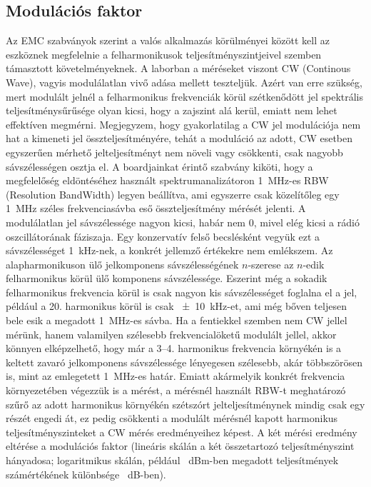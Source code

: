         \subsection{Modulációs faktor}
            Az EMC szabványok szerint a valós alkalmazás körülményei között kell az eszköznek megfelelnie a felharmonikusok teljesítményszintjeivel szemben támasztott követelményeknek. A laborban a méréseket viszont CW (Continous Wave), vagyis modulálatlan vivő adása mellett teszteljük. Azért van erre szükség, mert modulált jelnél a felharmonikus frekvenciák körül szétkenődött jel spektrális teljesítménysűrűsége olyan kicsi, hogy a zajszint alá kerül, emiatt nem lehet effektíven megmérni. Megjegyzem, hogy gyakorlatilag a CW jel modulációja nem hat a kimeneti jel összteljesítményére, tehát a moduláció az adott, CW esetben egyszerűen mérhető jelteljesítményt nem növeli vagy csökkenti, csak nagyobb sávszélességen osztja el. A boardjainkat érintő szabvány kiköti, hogy a megfelelőség eldöntéséhez használt spektrumanalizátoron \SI{1}{MHz}-es RBW (Resolution BandWidth) legyen beállítva, ami egyszerre csak közelítőleg egy \SI{1}{MHz} széles frekvenciasávba eső összteljesítmény mérését jelenti. A modulálatlan jel sávszélessége nagyon kicsi, habár nem 0, mivel elég kicsi a rádió oszcillátorának fáziszaja. Egy konzervatív felső becslésként vegyük ezt a sávszélességet \SI{1}{kHz}-nek, a konkrét jellemző értékekre nem emlékszem. Az alapharmonikuson ülő jelkomponens sávszélességének $n$-szerese az $n$-edik felharmonikus körül ülő komponens sávszélessége. Eszerint még a sokadik felharmonikus frekvencia körül is csak nagyon kis sávszélességet foglalna el a jel, például a 20. harmonikus körül is csak \SI{\pm10}{kHz}-et, ami még bőven teljesen bele esik a megadott \SI{1}{MHz}-es sávba. Ha a fentiekkel szemben nem CW jellel mérünk, hanem valamilyen szélesebb frekvencialöketű modulált jellel, akkor könnyen elképzelhető, hogy már a 3--4. harmonikus frekvencia környékén is a keltett zavaró jelkomponens sávszélessége lényegesen szélesebb, akár többszörösen is, mint az emlegetett \SI{1}{MHz}-es határ. Emiatt akármelyik konkrét frekvencia környezetében végezzük is a mérést, a mérésnél használt RBW-t meghatározó szűrő az adott harmonikus környékén szétszórt jelteljesítménynek mindig csak egy részét engedi át, ez pedig csökkenti a modulált mérésnél kapott harmonikus teljesítményszinteket a CW mérés eredményeihez képest. A két mérési eredmény eltérése a modulációs faktor (lineáris skálán a két összetartozó teljesítményszint hányadosa; logaritmikus skálán, például \SI{}{dBm}-ben megadott teljesítmények számértékének különbsége \SI{}{dB}-ben).
